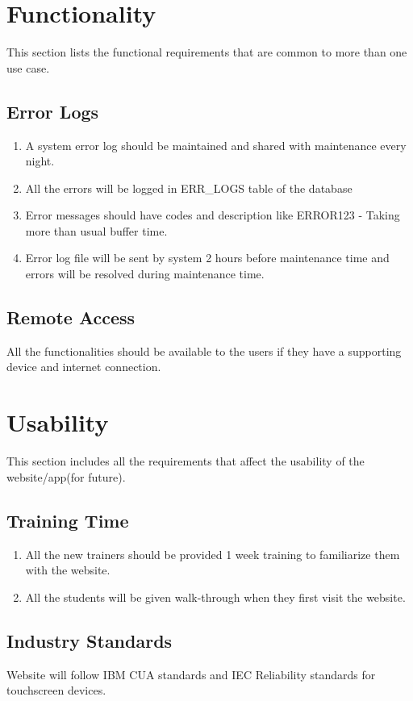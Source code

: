 \documentclass{report}
\begin{document}
\section{ Functionality}
This section lists the functional requirements that are common to more than one use case.
\subsection{Error Logs}
\begin{enumerate}
    \item A system error log should be maintained and shared with maintenance every night.
    \item All the errors will be logged in ERR\_LOGS table of the database 
    \item Error messages should have codes and description like ERROR123 - Taking more than usual buffer time.
    \item Error log file will be sent by system 2 hours before maintenance time and errors will be resolved during maintenance time.
\end{enumerate}

\subsection{Remote Access}
All the functionalities should be available to the users if they have a supporting device and internet connection.

\section{ Usability}
This section includes all the requirements that affect the usability of the website/app(for future).
\subsection{Training Time}
\begin{enumerate}
    \item All the new trainers should be provided 1 week training to familiarize them with the website.
    \item All the students will be given walk-through when they first visit the website.
\end{enumerate}

\subsection{Industry Standards}
Website will follow IBM CUA standards and IEC Reliability standards for touchscreen devices.
\end{document}
